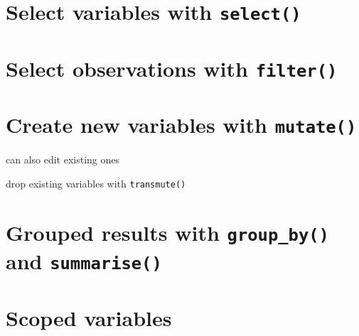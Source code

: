 \documentclass[]{book}
\newenvironment{Shaded}{}{}
\newcommand{\CommentTok}[1]{\textcolor[rgb]{0.38,0.63,0.69}{\textit{#1}}}
\newcommand{\ControlFlowTok}[1]{\textcolor[rgb]{0.00,0.44,0.13}{\textbf{#1}}}
\newcommand{\KeywordTok}[1]{\textcolor[rgb]{0.00,0.44,0.13}{\textbf{#1}}}
\newcommand{\NormalTok}[1]{#1}
\newcommand{\OperatorTok}[1]{\textcolor[rgb]{0.40,0.40,0.40}{#1}}
\newcommand{\StringTok}[1]{\textcolor[rgb]{0.25,0.44,0.63}{#1}}
\begin{document}
\hypertarget{select-variables-with-select}{%
\section{\texorpdfstring{Select variables with \texttt{select()}}{Select variables with select()}}\label{select-variables-with-select}}

\hypertarget{select-observations-with-filter}{%
\section{\texorpdfstring{Select observations with \texttt{filter()}}{Select observations with filter()}}\label{select-observations-with-filter}}

\hypertarget{create-new-variables-with-mutate}{%
\section{\texorpdfstring{Create new variables with \texttt{mutate()}}{Create new variables with mutate()}}\label{create-new-variables-with-mutate}}

can also edit existing ones

drop existing variables with \texttt{transmute()}

\hypertarget{grouped-results-with-group_by-and-summarise}{%
\section{\texorpdfstring{Grouped results with \texttt{group\_by()} and \texttt{summarise()}}{Grouped results with group\_by() and summarise()}}\label{grouped-results-with-group_by-and-summarise}}

\hypertarget{scoped-variables}{%
\section{Scoped variables}\label{scoped-variables}}

\begin{Shaded}
\end{Shaded}
\end{document}

